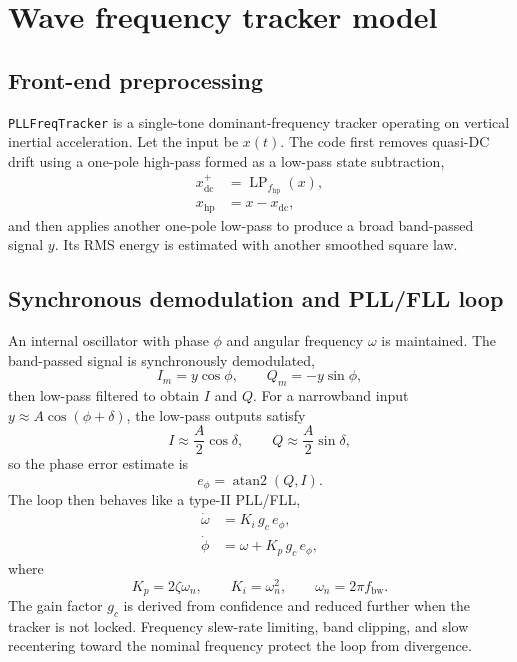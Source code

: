 \documentclass[conference]{IEEEtran}
\DeclareMathOperator{\atanTwo}{atan2}
\begin{document}
\section{Wave frequency tracker model}
\subsection{Front-end preprocessing}
\texttt{PLLFreqTracker} is a single-tone dominant-frequency tracker operating on vertical inertial acceleration. Let the input be $x(t)$. The code first removes quasi-DC drift using a one-pole high-pass formed as a low-pass state subtraction,
\begin{align}
 x_{\mathrm{dc}}^+ &= \operatorname{LP}_{f_{\mathrm{hp}}}(x),\\
 x_{\mathrm{hp}} &= x - x_{\mathrm{dc}},
\end{align}
and then applies another one-pole low-pass to produce a broad band-passed signal $y$. Its RMS energy is estimated with another smoothed square law.

\subsection{Synchronous demodulation and PLL/FLL loop}
An internal oscillator with phase $\phi$ and angular frequency $\omega$ is maintained. The band-passed signal is synchronously demodulated,
\begin{equation}
I_m = y\cos\phi, \qquad Q_m = -y\sin\phi,
\end{equation}
then low-pass filtered to obtain $I$ and $Q$. For a narrowband input $y\approx A\cos(\phi+\delta)$, the low-pass outputs satisfy
\begin{equation}
 I\approx \frac{A}{2}\cos\delta, \qquad Q\approx \frac{A}{2}\sin\delta,
\end{equation}
so the phase error estimate is
\begin{equation}
 e_\phi = \atanTwo(Q,I).
\end{equation}
The loop then behaves like a type-II PLL/FLL,
\begin{align}
 \dot{\omega} &= K_i\,g_c\,e_\phi,\\
 \dot{\phi} &= \omega + K_p\,g_c\,e_\phi,
\end{align}
where
\begin{equation}
K_p = 2\zeta\omega_n,\qquad K_i = \omega_n^2,\qquad \omega_n = 2\pi f_{\mathrm{bw}}.
\end{equation}
The gain factor $g_c$ is derived from confidence and reduced further when the tracker is not locked. Frequency slew-rate limiting, band clipping, and slow recentering toward the nominal frequency protect the loop from divergence.
\end{document}
